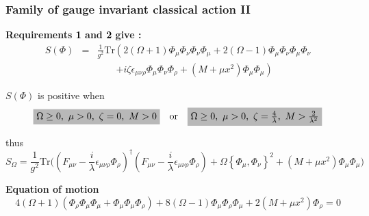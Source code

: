 \documentclass[9pt]{beamer}
\begin{document}
\begin{frame}

\frametitle{Family of gauge invariant classical action II}

\vfill

\textbf{Requirements \textcolor{black}{1} and \textcolor{black}{2} give :}
\vspace*{-2pt}
\begin{eqnarray*}
S(\Phi) &=& 
\frac{1}{g^2} \mbox{Tr}\left( 2(\Omega+1) \Phi_\mu \Phi_\nu \Phi_\nu \Phi_\mu + 2(\Omega-1) \Phi_\mu \Phi_\nu \Phi_\mu \Phi_\nu \right.\\
&& \qquad \left. + i \zeta \epsilon_{\mu\nu\rho} \Phi_\mu \Phi_\nu \Phi_\rho + (M+\mu x^2) \Phi_\mu \Phi_\mu \right)
\end{eqnarray*}

$S(\Phi)$ is positive when 
\vspace*{-2pt}
\begin{equation*}
\tikz[baseline]{\node[fill=black!28!white,anchor=base] (t1) {$\Omega\geq0,\ \mu>0,\ \zeta=0,\ M>0$};}
\quad\mbox{or}\quad
\tikz[baseline]{\node[fill=black!28!white,anchor=base] (t1) {$\Omega\geq0,\ \mu>0,\ \zeta=\frac{4}{\lambda},\ M>\frac{2}{\lambda^2}$};}
\end{equation*}

thus
\vspace*{-2pt}
\begin{equation*}
S_\Omega = \frac{1}{g^2} \mbox{Tr}\big((F_{\mu\nu} - \frac{i}{\lambda} \epsilon_{\mu\nu\rho} \Phi_\rho)^\dag (F_{\mu\nu} - \frac{i}{\lambda} \epsilon_{\mu\nu\rho} \Phi_\rho) + \Omega\left\{\Phi_\mu,\Phi_\nu\right\}^2 + (M+\mu x^2) \Phi_\mu \Phi_\mu \big)
\end{equation*}

\vfill

\textbf{Equation of motion}
\vspace*{-2pt}
\begin{equation*}
4(\Omega+1)(\Phi_\rho\Phi_\mu\Phi_\mu+\Phi_\mu\Phi_\mu\Phi_\rho)+8(\Omega-1)\Phi_\mu\Phi_\rho\Phi_\mu+2(M+\mu x^2) \Phi_\rho = 0
\end{equation*}


\vfill

\end{frame}

\end{document}
